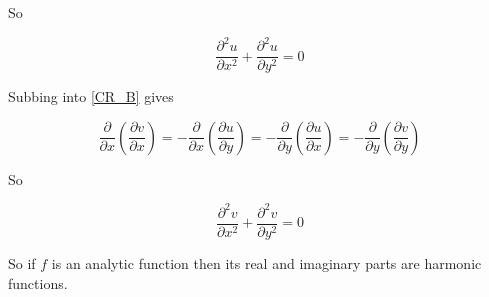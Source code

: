 So 

\begin{displaymath}
\frac{\partial^2 u}{\partial x^2} + \frac{\partial^2 u}{\partial y^2} = 0
\end{displaymath}

Subbing into \ref{CR_B} gives 

\begin{displaymath}
\frac{\partial}{\partial x}(\frac{\partial v}{\partial x}) 
= -\frac{\partial}{\partial x}(\frac{\partial u}{\partial y})
= -\frac{\partial}{\partial y}(\frac{\partial u}{\partial x})
= -\frac{\partial}{\partial y}(\frac{\partial v}{\partial y})
\end{displaymath}

So 

\begin{displaymath}
\frac{\partial^2 v}{\partial x^2} + \frac{\partial^2 v}{\partial y^2} = 0
\end{displaymath}

So if $f$ is an analytic function then its real and imaginary parts are harmonic functions.